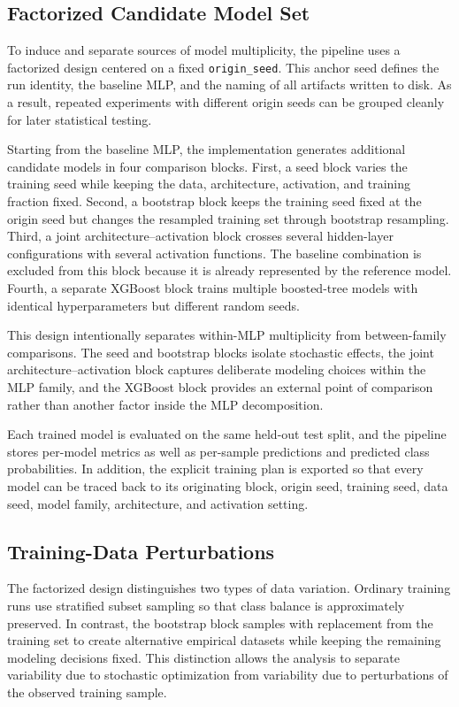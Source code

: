 \subsection{Factorized Candidate Model Set}

To induce and separate sources of model multiplicity, the pipeline uses a factorized design centered on a fixed \texttt{origin\_seed}. This anchor seed defines the run identity, the baseline MLP, and the naming of all artifacts written to disk. As a result, repeated experiments with different origin seeds can be grouped cleanly for later statistical testing.

Starting from the baseline MLP, the implementation generates additional candidate models in four comparison blocks. First, a seed block varies the training seed while keeping the data, architecture, activation, and training fraction fixed. Second, a bootstrap block keeps the training seed fixed at the origin seed but changes the resampled training set through bootstrap resampling. Third, a joint architecture--activation block crosses several hidden-layer configurations with several activation functions. The baseline combination is excluded from this block because it is already represented by the reference model. Fourth, a separate XGBoost block trains multiple boosted-tree models with identical hyperparameters but different random seeds.

This design intentionally separates within-MLP multiplicity from between-family comparisons. The seed and bootstrap blocks isolate stochastic effects, the joint architecture--activation block captures deliberate modeling choices within the MLP family, and the XGBoost block provides an external point of comparison rather than another factor inside the MLP decomposition.

Each trained model is evaluated on the same held-out test split, and the pipeline stores per-model metrics as well as per-sample predictions and predicted class probabilities. In addition, the explicit training plan is exported so that every model can be traced back to its originating block, origin seed, training seed, data seed, model family, architecture, and activation setting.

\subsection{Training-Data Perturbations}

The factorized design distinguishes two types of data variation. Ordinary training runs use stratified subset sampling so that class balance is approximately preserved. In contrast, the bootstrap block samples with replacement from the training set to create alternative empirical datasets while keeping the remaining modeling decisions fixed. This distinction allows the analysis to separate variability due to stochastic optimization from variability due to perturbations of the observed training sample.

